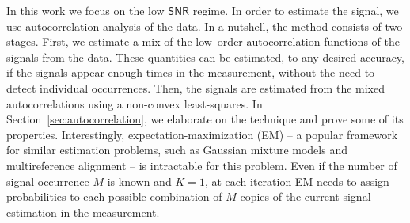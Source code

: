 \documentclass[english,11pt]{article}
\numberwithin{equation}{section}
\theoremstyle{plain}
\theoremstyle{definition}
\theoremstyle{remark}
\theoremstyle{plain}
\theoremstyle{remark}
\theoremstyle{plain}
\theoremstyle{plain}
\newcommand{\SNR}{{\textsf{SNR}}}
\begin{document}
In this work we focus on the low $\SNR$ regime. In order to estimate the signal, we use autocorrelation analysis of the data. 
In a nutshell, the method consists of two stages. First, we estimate a mix of the low--order autocorrelation functions of the signals from the data. These quantities can be estimated, to any desired accuracy, if the signals appear enough times in the measurement, without the need to detect individual occurrences. Then, the signals are estimated from the mixed autocorrelations using a non-convex least-squares.
In Section~\ref{sec:autocorrelation}, we elaborate on the technique and prove some of its properties.
Interestingly, expectation-maximization (EM) --  a popular framework for similar estimation problems, such as Gaussian mixture models and multireference alignment -- is intractable for this problem. Even if the number of signal occurrence $M$ is known and $K=1$, at each iteration 
EM needs to assign probabilities to each possible combination of  $M$ copies of the current signal estimation in the measurement.
\end{document}
